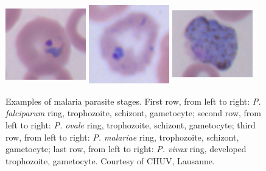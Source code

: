 \documentclass[final,a4paper,12pt,english]{UnicaPhdThesis3}
\begin{document}
\begin{figure}[H]
		\includegraphics[width=3.5cm, height=3.5cm]{images/malaria/vivax_1_ring}
		\includegraphics[width=3.5cm, height=3.5cm]{images/malaria/vivax_2c_trophozoiteDeveloped}
		\includegraphics[width=3.5cm, height=3.5cm]{images/malaria/vivax_4_gametocyte}
		\caption{\label{fig:malaria_stages}Examples of malaria parasite stages.
			First row, from left to right: \emph{P. falciparum} ring, trophozoite, schizont, gametocyte;
			second row, from left to right: \emph{P. ovale} ring, trophozoite, schizont, gametocyte;
			third row, from left to right: \emph{P. malariae} ring, trophozoite, schizont, gametocyte;
			last row, from left to right: \emph{P. vivax} ring, developed trophozoite, gametocyte.
			Courtesy of CHUV, Lausanne.}
	\end{figure}
	
\end{document}
